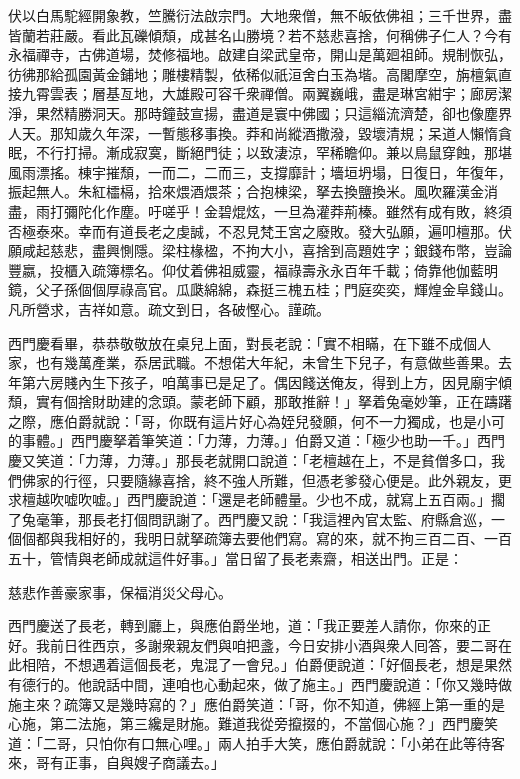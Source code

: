 \begin{myquote}[\markfont]
伏以白馬駝經開象教，竺騰衍法啟宗門。大地衆僧，無不皈依佛祖；三千世界，盡皆蘭若莊嚴。看此瓦礫傾頹，成甚名山勝境？若不慈悲喜捨，何稱佛子仁人？今有永福禪寺，古佛道場，焚修福地。啟建自梁武皇帝，開山是萬廻祖師。規制恢弘，彷彿那給孤園黃金鋪地；雕樓精製，依稀似祇洹舍白玉為堦。高閣摩空，旃檀氣直接九霄雲表；層基亙地，大雄殿可容千衆禪僧。兩翼巍峨，盡是琳宮紺宇；廊房潔淨，果然精勝洞天。那時鐘鼓宣揚，盡道是寰中佛國；只這緇流濟楚，卻也像塵界人天。那知歲久年深，一暫態移事換。莽和尚縱酒撒潑，毀壞清規；呆道人懶惰貪眠，不行打掃。{}漸成寂寞，斷絕門徒；以致淒涼，罕稀瞻仰。兼以鳥鼠穿蝕，那堪風雨漂搖。棟宇摧頹，一而二，二而三，支撐靡計；墻垣坍塌，日復日，年復年，振起無人。朱紅櫺槅，拾來煨酒煨茶；合抱棟梁，拏去換鹽換米。風吹羅漢金消盡，雨打彌陀化作塵。吁嗟乎！金碧焜炫，一旦為灌莽荊榛。雖然有成有敗，終須否極泰來。幸而有道長老之虔誠，不忍見梵王宮之廢敗。發大弘願，遍叩檀那。伏願咸起慈悲，盡興惻隱。梁柱椽楹，不拘大小，喜捨到高題姓字；銀錢布幣，豈論豐嬴，投櫃入疏簿標名。仰仗着佛祖威靈，福祿壽永永百年千載；倚靠他伽藍明鏡，父子孫個個厚祿高官。瓜瓞綿綿，森挺三槐五桂；門庭奕奕，輝煌金阜錢山。凡所營求，吉祥如意。疏文到日，各破慳心。謹疏。
\end{myquote}

西門慶看畢，恭恭敬敬放在桌兒上面，對長老說：「實不相瞞，在下雖不成個人家，也有幾萬產業，{}忝居武職。不想偌大年紀，未曾生下兒子，有意做些善果。去年第六房賤內生下孩子，咱萬事已是足了。偶因餞送俺友，得到上方，因見廟宇傾頹，實有個捨財助建的念頭。蒙老師下顧，那敢推辭！」拏着兔毫妙筆，正在躊躇之際，應伯爵就說：「哥，你既有這片好心為姪兒發願，何不一力獨成，{}也是小可的事體。」西門慶拏着筆笑道：「力薄，力薄。」伯爵又道：「極少也助一千。」西門慶又笑道：「力薄，力薄。」那長老就開口說道：「老檀越在上，不是貧僧多口，我們佛家的行徑，只要隨緣喜捨，終不強人所難，但憑老爹發心便是。此外親友，更求檀越吹嘘吹嘘。」西門慶說道：「還是老師體量。少也不成，就寫上五百兩。」擱了兔毫筆，那長老打個問訊謝了。西門慶又說：「我這裡內官太監、府縣倉巡，一個個都與我相好的，我明日就拏疏簿去要他們寫。寫的來，就不拘三百二百、一百五十，管情與老師成就這件好事。」當日留了長老素齋，相送出門。正是：

\begin{myquote}
慈悲作善豪家事，保福消災父母心。
\end{myquote}

西門慶送了長老，轉到廳上，與應伯爵坐地，道：「我正要差人請你，你來的正好。我前日徃西京，多謝衆親友們與咱把盞，今日安排小酒與衆人囘答，要二哥在此相陪，不想遇着這個長老，鬼混了一會兒。」伯爵便說道：「好個長老，想是果然有德行的。他說話中間，連咱也心動起來，做了施主。」西門慶說道：「你又幾時做施主來？疏簿又是幾時寫的？」{}應伯爵笑道：「哥，你不知道，佛經上第一重的是心施，第二法施，第三纔是財施。難道我從旁攛掇的，不當個心施？」{}西門慶笑道：「二哥，只怕你有口無心哩。」兩人拍手大笑，應伯爵就說：「小弟在此等待客來，哥有正事，自與嫂子商議去。」

